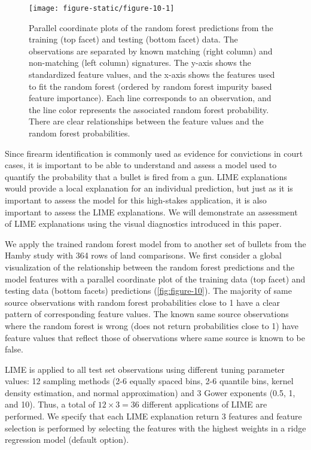 \documentclass[AMS,STIX2COL]{WileyNJD-v2}\usepackage[]{graphicx}\usepackage[]{color}
\newenvironment{knitrout}{}{} %
\begin{document}
\begin{figure}[!thp]
\begin{knitrout}
\color{fgcolor}

{\centering \texttt{[image: figure-static/figure-10-1]} 

}



\end{knitrout}
\caption{Parallel coordinate plots of the \citet{hare:2016} random forest predictions from the training (top facet) and testing (bottom facet) data. The observations are separated by known matching (right column) and non-matching (left column) signatures. The y-axis shows the standardized feature values, and the x-axis shows the features used to fit the random forest (ordered by random forest impurity based feature importance). Each line corresponds to an observation, and the line color represents the associated random forest probability. There are clear relationships between the feature values and the random forest probabilities.}
\label{fig:figure-10}
\end{figure}

Since firearm identification is commonly used as evidence for convictions in court cases, it is important to be able to understand and assess a model used to quantify the probability that a bullet is fired from a gun. LIME explanations would provide a local explanation for an individual prediction, but just as it is important to assess the model for this high-stakes application, it is also important to assess the LIME explanations. We will demonstrate an assessment of LIME explanations using the visual diagnostics introduced in this paper.

We apply the trained random forest model from \citet{hare:2016} to another set of bullets from the Hamby study with 364 rows of land comparisons. We first consider a global visualization of the relationship between the random forest predictions and the model features with a parallel coordinate plot of the training data (top facet) and testing data (bottom facets) predictions (\autoref{fig:figure-10}). The majority of same source observations with random forest probabilities close to 1 have a clear pattern of corresponding feature values. The known same source observations where the random forest is wrong (does not return probabilities close to 1) have feature values that reflect those of observations where same source is known to be false.

LIME is applied to all test set observations using different tuning parameter values: 12 sampling methods (2-6 equally spaced bins, 2-6 quantile bins, kernel density estimation, and normal approximation) and 3 Gower exponents (0.5, 1, and 10). Thus, a total of $12\times 3=36$ different applications of LIME are performed. We specify that each LIME explanation return 3 features and feature selection is performed by selecting the features with the highest weights in a ridge regression model (default option).
\end{document}
